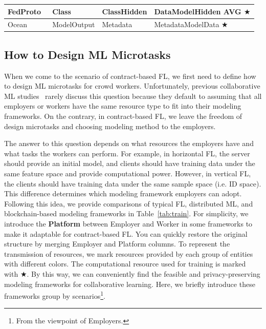 \begin{table}[t]
\begin{tabular}{|l|p{2.6cm}|p{4cm}|p{5cm}|}
    FedProto~\cite{tan2022fedproto, michieli2021prototype} & \colorbox{Employer!30}{Class} & \colorbox{Employer!30}{Class}\colorbox{Worker!30}{Hidden} & \colorbox{Worker!30}{Data}\colorbox{Worker!30}{Model}\colorbox{Platform!30}{Hidden AVG} $\bigstar$ \\ \hline   

    Ocean~\cite{mcconaghy2022ocean} & \colorbox{Employer!30}{Model}\colorbox{Worker!30}{Output} & \colorbox{Worker!30}{Metadata} & \colorbox{Worker!30}{Metadata}\colorbox{Employer!30}{Model}\colorbox{Worker!30}{Data} $\bigstar$ \\ \hline

    \end{tabular}
\end{table}

\subsection{How to Design ML Microtasks}
When we come to the scenario of contract-based FL, we first need to define how to design ML microtasks for crowd workers. 
Unfortunately, previous collaborative ML studies~\cite{li2021survey, nguyen2021federated} rarely discuss this question because they default to assuming that all employers or workers have the same resource type to fit into their modeling frameworks.
On the contrary, in contract-based FL, we leave the freedom of design microtasks and choosing modeling method to the employers.

The answer to this question depends on what resources the employers have and what tasks the workers can perform.
For example, in horizontal FL, the server should provide an initial model, and clients should have training data under the same feature space and provide computational power. However, in vertical FL, the clients should have training data under the same sample space (i.e. ID space). 
This difference determines which modeling framework employers can adopt. 
Following this idea, we provide comparisons of typical FL, distributed ML, and blockchain-based modeling frameworks in Table~\ref{tab:train}.
For simplicity, we introduce the \textbf{Platform} between Employer and Worker in some frameworks to make it adaptable for contract-based FL. 
You can quickly restore the original structure by merging Employer and Platform columns.
To represent the transmission of resources, we mark resources provided by each group of entities with different colors.
The computational resource used for training is marked with $\bigstar$.
By this way, we can conveniently find the feasible and privacy-preserving modeling frameworks for collaborative learning. 
Here, we briefly introduce these frameworks group by scenarios\footnote{From the viewpoint of Employers.}.

